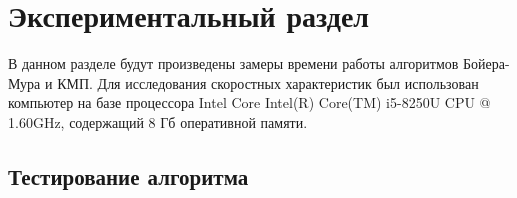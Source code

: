 \chapter{ Экспериментальный раздел}

В данном разделе будут произведены замеры времени работы алгоритмов Бойера-Мура и КМП. Для исследования скоростных характеристик был использован компьютер на базе процессора Intel Core Intel(R) Core(TM) i5-8250U CPU @ 1.60GHz, содержащий 8 Гб оперативной памяти.

\section{ Тестирование алгоритма}

\begin{table}[]
\end{table}
